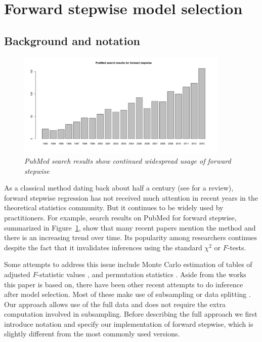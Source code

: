 \documentclass{imsart}
\begin{document}

\section{Forward stepwise model selection}
\label{sec:stepwise}

\subsection{Background and notation}

\begin{figure}
\begin{center}
\includegraphics[width=0.9\textwidth]{../figs/pubmed.pdf}
\caption{\small \em PubMed search results show continued widespread usage of forward stepwise}
\label{fig:pubmed}
\end{center}
\end{figure}


As a classical method dating back about half a century
(see \cite{classical:selection} for a review),
forward stepwise regression has not received much attention in
recent years in the theoretical statistics community. But it continues
to be widely used by practitioners.
For example, search results on PubMed for forward stepwise,
summarized in Figure~\ref{fig:pubmed}, show that many recent
papers mention the method and there is an increasing trend over time.
Its popularity among researchers continues despite the fact that it
invalidates inferences using the standard $\chi^2$ or $F$-tests.


Some attempts to address this issue include Monte Carlo
estimation of tables of adjusted $F$-statistic values \citep{mc:ftoenter},
and permutation statistics \citep{permutation:stop}. Aside from the works
this paper is based on, there have been other recent attempts to do
inference after model selection. Most of these make use of subsampling
\citep{meinshausen:buhlmann} or data splitting \citep{wasserman:roeder}.
Our approach allows use of the full data and does not require the
extra computation involved in subsampling.
Before describing the full approach we first introduce notation and
specify our implementation of forward stepwise, which is slightly
different from the most commonly used versions.
\end{document}
